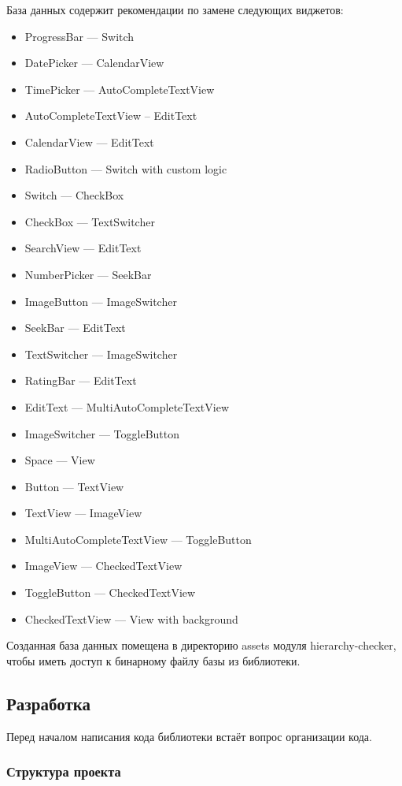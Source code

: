 \documentclass[a4paper,14pt]{extarticle} %
\begin{document}
	База данных содержит рекомендации по замене следующих виджетов:
	\begin{itemize}
		\item ProgressBar --- Switch
		\item DatePicker --- CalendarView
		\item TimePicker --- AutoCompleteTextView
		\item AutoCompleteTextView – EditText
		\item CalendarView --- EditText
		\item RadioButton --- Switch with custom logic
		\item Switch --- CheckBox
		\item CheckBox --- TextSwitcher
		\item SearchView --- EditText
		\item NumberPicker --- SeekBar
		\item ImageButton --- ImageSwitcher
		\item SeekBar --- EditText
		\item TextSwitcher --- ImageSwitcher
		\item RatingBar --- EditText
		\item EditText --- MultiAutoCompleteTextView
		\item ImageSwitcher --- ToggleButton
		\item Space --- View
		\item Button --- TextView
		\item TextView --- ImageView
		\item MultiAutoCompleteTextView --- ToggleButton
		\item ImageView --- CheckedTextView
		\item ToggleButton --- CheckedTextView
		\item CheckedTextView --- View with background
	\end{itemize}

	Созданная база данных помещена в директорию assets модуля hierarchy-checker, чтобы иметь доступ к бинарному файлу базы из библиотеки.

	\subsection{Разработка}
	
	Перед началом написания кода библиотеки встаёт вопрос организации кода.
	
	\subsubsection{Структура проекта}
	
\end{document}
